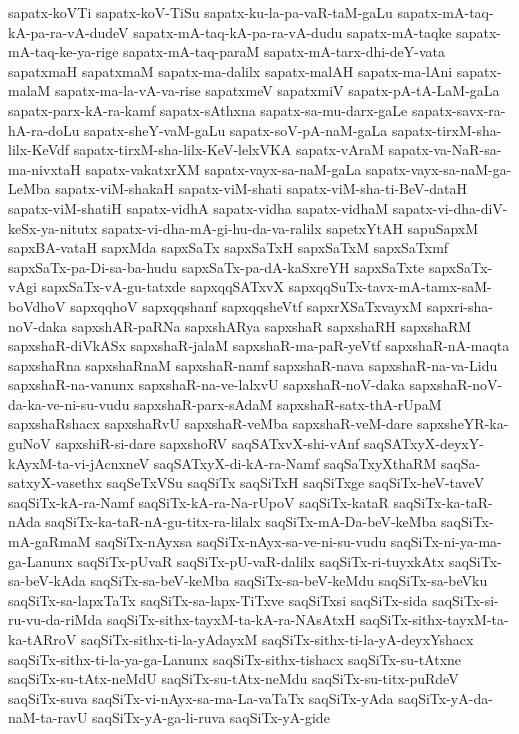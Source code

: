{sapatx-koVTi
sapatx-koV-TiSu
sapatx-ku-la-pa-vaR-taM-gaLu
sapatx-mA-taq-kA-pa-ra-vA-dudeV
sapatx-mA-taq-kA-pa-ra-vA-dudu
sapatx-mA-taqke
sapatx-mA-taq-ke-ya-rige
sapatx-mA-taq-paraM
sapatx-mA-tarx-dhi-deY-vata
sapatxmaH
sapatxmaM
sapatx-ma-dalilx
sapatx-malAH
sapatx-ma-lAni
sapatx-malaM
sapatx-ma-la-vA-va-rise
sapatxmeV
sapatxmiV
sapatx-pA-tA-LaM-gaLa
sapatx-parx-kA-ra-kamf
sapatx-sAthxna
sapatx-sa-mu-darx-gaLe
sapatx-savx-ra-hA-ra-doLu
sapatx-sheY-vaM-gaLu
sapatx-soV-pA-naM-gaLa
sapatx-tirxM-sha-lilx-KeVdf
sapatx-tirxM-sha-lilx-KeV-lelxVKA
sapatx-vAraM
sapatx-va-NaR-sa-ma-nivxtaH
sapatx-vakatxrXM
sapatx-vayx-sa-naM-gaLa
sapatx-vayx-sa-naM-ga-LeMba
sapatx-viM-shakaH
sapatx-viM-shati
sapatx-viM-sha-ti-BeV-dataH
sapatx-viM-shatiH
sapatx-vidhA
sapatx-vidha
sapatx-vidhaM
sapatx-vi-dha-diV-keSx-ya-nitutx
sapatx-vi-dha-mA-gi-hu-da-va-ralilx
sapetxYtAH
sapuSapxM
sapxBA-vataH
sapxMda
sapxSaTx
sapxSaTxH
sapxSaTxM
sapxSaTxmf
sapxSaTx-pa-Di-sa-ba-hudu
sapxSaTx-pa-dA-kaSxreYH
sapxSaTxte
sapxSaTx-vAgi
sapxSaTx-vA-gu-tatxde
sapxqqSATxvX
sapxqqSuTx-tavx-mA-tamx-saM-boVdhoV
sapxqqhoV
sapxqqshanf
sapxqqsheVtf
sapxrXSaTxvayxM
sapxri-sha-noV-daka
sapxshAR-paRNa
sapxshARya
sapxshaR
sapxshaRH
sapxshaRM
sapxshaR-diVkASx
sapxshaR-jalaM
sapxshaR-ma-paR-yeVtf
sapxshaR-nA-maqta
sapxshaRna
sapxshaRnaM
sapxshaR-namf
sapxshaR-nava
sapxshaR-na-va-Lidu
sapxshaR-na-vanunx
sapxshaR-na-ve-lalxvU
sapxshaR-noV-daka
sapxshaR-noV-da-ka-ve-ni-su-vudu
sapxshaR-parx-sAdaM
sapxshaR-satx-thA-rUpaM
sapxshaRshacx
sapxshaRvU
sapxshaR-veMba
sapxshaR-veM-dare
sapxsheYR-ka-guNoV
sapxshiR-si-dare
sapxshoRV
saqSATxvX-shi-vAnf
saqSATxyX-deyxY-kAyxM-ta-vi-jAcnxneV
saqSATxyX-di-kA-ra-Namf
saqSaTxyXthaRM
saqSa-satxyX-vasethx
saqSeTxVSu
saqSiTx
saqSiTxH
saqSiTxge
saqSiTx-heV-taveV
saqSiTx-kA-ra-Namf
saqSiTx-kA-ra-Na-rUpoV
saqSiTx-kataR
saqSiTx-ka-taR-nAda
saqSiTx-ka-taR-nA-gu-titx-ra-lilalx
saqSiTx-mA-Da-beV-keMba
saqSiTx-mA-gaRmaM
saqSiTx-nAyxsa
saqSiTx-nAyx-sa-ve-ni-su-vudu
saqSiTx-ni-ya-ma-ga-Lanunx
saqSiTx-pUvaR
saqSiTx-pU-vaR-dalilx
saqSiTx-ri-tuyxkAtx
saqSiTx-sa-beV-kAda
saqSiTx-sa-beV-keMba
saqSiTx-sa-beV-keMdu
saqSiTx-sa-beVku
saqSiTx-sa-lapxTaTx
saqSiTx-sa-lapx-TiTxve
saqSiTxsi
saqSiTx-sida
saqSiTx-si-ru-vu-da-riMda
saqSiTx-sithx-tayxM-ta-kA-ra-NAsAtxH
saqSiTx-sithx-tayxM-ta-ka-tARroV
saqSiTx-sithx-ti-la-yAdayxM
saqSiTx-sithx-ti-la-yA-deyxYshacx
saqSiTx-sithx-ti-la-ya-ga-Lanunx
saqSiTx-sithx-tishacx
saqSiTx-su-tAtxne
saqSiTx-su-tAtx-neMdU
saqSiTx-su-tAtx-neMdu
saqSiTx-su-titx-puRdeV
saqSiTx-suva
saqSiTx-vi-nAyx-sa-ma-La-vaTaTx
saqSiTx-yAda
saqSiTx-yA-da-naM-ta-ravU
saqSiTx-yA-ga-li-ruva
saqSiTx-yA-gide
}
